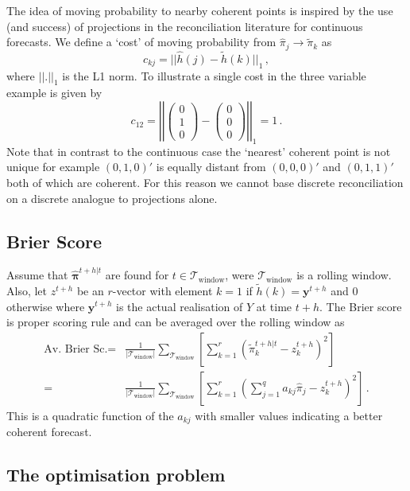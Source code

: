 \documentclass[a4paper,review,12pt,authoryear]{elsarticle}
\newcommand{\bpi}{\bm{\pi}}
\begin{document}
    The idea of moving probability to nearby coherent points is inspired by the use (and success) of projections in the reconciliation literature for continuous forecasts. We define a `cost' of moving probability from $\hat{\pi}_j\rightarrow\tilde{\pi}_k$ as
    \[
    c_{kj}=||\hat{h}(j)-\tilde{h}(k)||_1\,,
    \]
    where $||.||_1$ is the L1 norm. To illustrate a single cost in the three variable example is given by
    \[
    c_{12}=\left|\left|\begin{pmatrix}0\\1\\0\end{pmatrix}-\begin{pmatrix}0\\0\\0\end{pmatrix}\right|\right|_1=1\,.
    \]
    Note that in contrast to the continuous case the `nearest' coherent point is not unique for example $(0,1,0)'$ is equally distant from $(0,0,0)'$ and $(0,1,1)'$ both of which are coherent. For this reason we cannot base discrete reconciliation on a discrete analogue to projections alone.
    
    \subsection{Brier Score}
    
    Assume that $\hat{\bpi}^{t+h|t}$ are found for $t\in\mathcal{T}_{\textrm{window}}$, were $\mathcal{T}_{\textrm{window}}$ is a rolling window. Also, let $z^{t+h}$ be an $r$-vector with element $k=1$ if $\tilde{h}(k)=\bm{y}^{t+h}$ and $0$ otherwise where $\bm{y}^{t+h}$ is the actual realisation of $Y$ at time $t+h$. The Brier score is  proper scoring rule and can be averaged over the rolling window as
    \begin{align*}
    \textrm{Av. Brier Sc.}=&\frac{1}{|\mathcal{T}_{\textrm{window}}|}\sum\limits_{\mathcal{T}_{\textrm{window}}}\left[\sum\limits_{k=1}^r\left(\tilde{\pi}_k^{t+h|t}-z^{t+h}_k\right)^2\right]\\
    =&\frac{1}{|\mathcal{T}_{\textrm{window}}|}\sum\limits_{\mathcal{T}_{\textrm{window}}}\left[\sum\limits_{k=1}^r\left(\sum\limits_{j=1}^q a_{kj}\hat{{\pi}}_j-z^{t+h}_k\right)^2\right]\,.
    \end{align*}
    This is a quadratic function of the $a_{kj}$ with smaller values indicating a better coherent forecast.
    
    \subsection{The optimisation problem}
    
\end{document}
